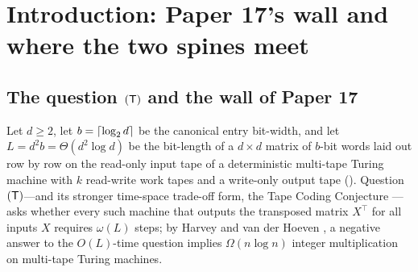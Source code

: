 \section{Introduction: Paper 17's wall and where the two spines meet}\label{sec:intro}

\subsection{The question \texorpdfstring{$(\mathsf{T})$}{(T)} and the wall of Paper 17}\label{sec:wall-context}

Let $d \ge 2$, let $b = \lceil \log_2 d \rceil$ be the canonical entry bit-width, and let
$L = d^2 b = \Theta(d^2\log d)$ be the bit-length of a $d \times d$ matrix of $b$-bit words
laid out row by row on the read-only input tape of a deterministic multi-tape Turing machine
with $k$ read-write work tapes and a write-only output tape
(\cite[Definition~2.1]{FirstPaper2026}). Question $(\mathsf{T})$---and its stronger time-space trade-off
form, the Tape Coding Conjecture \cite[Conjecture~9.1]{FirstPaper2026}---asks whether every
such machine that outputs the transposed matrix $X^\top$ for all inputs $X$ requires
$\omega(L)$ steps; by Harvey and van der Hoeven \cite{HvdH2025}, a negative answer to the
$O(L)$-time question implies $\Omega(n\log n)$ integer multiplication on multi-tape Turing
machines.

